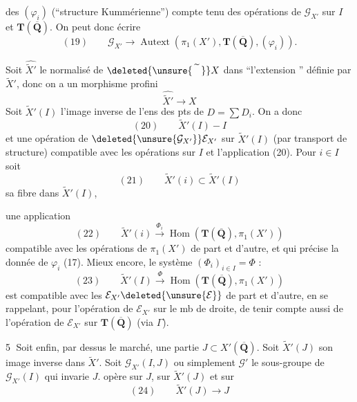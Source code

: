 des $(\varphi_i)$ (``structure Kummérienne'')
compte tenu des opérations  de $\mathcal G_{X'}$
sur $I$ et $\mathbf T(\overline{\mathbf Q})$. On peut donc
écrire
\[
(19)\qquad\mathcal G_{X'}\longrightarrow\operatorname{Autext}(\pi_1(X'),\mathbf T(\overline{\mathbf Q}),(\varphi_i)).
\]

Soit $\widehat{\widetilde X'}$ le normalisé de $\deleted{\unsure{\widetilde{\phantom X}}}X$ dans ``l'extension
'' définie par $\widetilde X'$, donc on a un
morphisme profini
\[
\widehat{\widetilde X'}\longrightarrow X
\]
Soit $\widetilde X'(I)$ l'image inverse de l'ens des
pts   de $D=\sum D_i$. On a
donc
\[
(20)\qquad\widetilde X'(I)\mathbin{-}I
\]
et une opération de $\deleted{\unsure{\mathcal G_{X'}}}\mathcal E_{X'}$ sur
$\widetilde X'(I)$ (par transport de structure)
compatible avec les opérations sur $I$
et l'application (20). Pour $i\in I$ soit
\[
(21)\qquad\widetilde X'(i)\subset\widetilde X'(I)
\]
sa fibre dans $\widetilde X'(I)$, 

une application
\[
(22)\qquad\widetilde X'(i)\xrightarrow{\Phi_i}\operatorname{Hom}(\mathbf T(\overline{\mathbf Q}),\pi_1(X'))
\]
compatible avec les opérations de $\pi_1(X')$
de part et d'autre, et qui précise
la donnée de $\varphi_i$ (17). Mieux encore,
le système $(\Phi_i)_{i\in I}=\Phi$ :
\[
(23)\qquad\widetilde X'(I)\xrightarrow{\Phi}\operatorname{Hom}(\mathbf T(\overline{\mathbf Q}),\pi_1(X'))
\]
est compatible avec les $\mathcal E_{X'}\deleted{\unsure{\mathcal E}}$ de part et
d'autre, en se rappelant, pour l'opération
de $\mathcal E_{X'}$ sur le mb de droite, de tenir
compte aussi de l'opération de $\mathcal E_{X'}$
sur $\mathbf T(\overline{\mathbf Q})$ (via $\Gamma$).

\textcircled{5} Soit enfin, par dessus le marché, une
partie $J\subset X'(\overline{\mathbf Q})$. Soit $\widetilde X'(J)$ son
image inverse dans $\widetilde X'$. Soit $\mathcal G_{X'}(I,J)$
ou simplement $\mathcal G'$ le sous-groupe de $\mathcal G_{X'}(I)$
qui invarie $J$. \deleted{\unsure{On voit les structures}} 
opère sur $J$, sur $\widetilde X'(J)$ et sur
\[
(24)\qquad\widetilde X'(J)\longrightarrow J
\]

